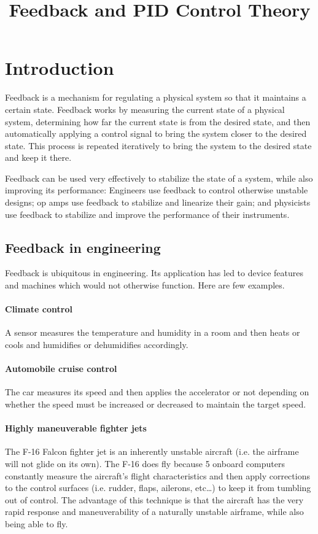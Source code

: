 \documentclass{article}
\title{Feedback and PID Control Theory}
\begin{document}
\maketitle

\section{Introduction}
Feedback is a mechanism for regulating a physical system so that it maintains a certain state. Feedback works by measuring the current state of a physical system, determining how far the current state is from the desired state, and then automatically applying a control signal to bring the system closer to the desired state. This process is repeated iteratively to bring the system to the desired state and keep it there.

Feedback can be used very effectively to stabilize the state of a system, while also improving its performance: Engineers use feedback to control otherwise unstable designs; op amps use feedback to stabilize and linearize their gain; and physicists use feedback to stabilize and improve the performance of their instruments.

\subsection{Feedback in engineering}
Feedback is ubiquitous in engineering. Its application has led to device features and machines which would not otherwise function. Here are few examples.

\paragraph{Climate control} A sensor measures the temperature and humidity in a room and then heats or cools and humidifies or dehumidifies accordingly.

\paragraph{Automobile cruise control} The car measures its speed and then applies the accelerator or not depending on whether the speed must be increased or decreased to maintain the target speed.

\paragraph{Highly maneuverable fighter jets} The F-16 Falcon fighter jet is an inherently unstable aircraft (i.e. the airframe will not glide on its own). The F-16 does fly because 5 onboard computers constantly measure the aircraft's flight characteristics and then apply corrections to the control surfaces (i.e. rudder, flaps, ailerons, etc\ldots) to keep it from tumbling out of control. The advantage of this technique is that the aircraft has the very rapid response and maneuverability of a naturally unstable airframe, while also being able to fly.
\end{document}
